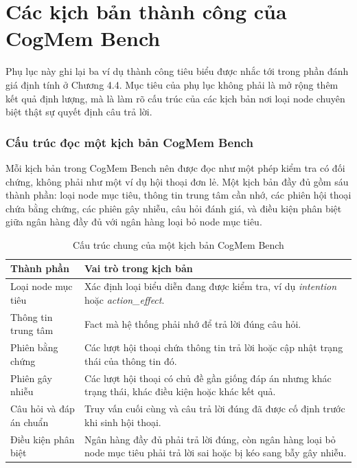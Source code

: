 \documentclass[../main.tex]{subfiles}
\begin{document}
\chapter{Các kịch bản thành công của CogMem Bench}
\label{app:cogmem_bench_success_cases}

Phụ lục này ghi lại ba ví dụ thành công tiêu biểu được nhắc tới trong phần đánh giá định tính ở Chương 4.4. Mục tiêu của phụ lục không phải là mở rộng thêm kết quả định lượng, mà là làm rõ cấu trúc của các kịch bản nơi loại node chuyên biệt thật sự quyết định câu trả lời.

\subsection{Cấu trúc đọc một kịch bản CogMem Bench}

Mỗi kịch bản trong CogMem Bench nên được đọc như một phép kiểm tra có đối chứng, không phải như một ví dụ hội thoại đơn lẻ. Một kịch bản đầy đủ gồm sáu thành phần: loại node mục tiêu, thông tin trung tâm cần nhớ, các phiên hội thoại chứa bằng chứng, các phiên gây nhiễu, câu hỏi đánh giá, và điều kiện phân biệt giữa ngân hàng đầy đủ với ngân hàng loại bỏ node mục tiêu.

\begin{table}[H]
\centering
\caption{Cấu trúc chung của một kịch bản CogMem Bench}
\label{tab:appendix_cogmem_bench_case_structure}
\small
\begin{tabularx}{\linewidth}{@{}p{3.1cm}Y@{}}
\toprule
\textbf{Thành phần} & \textbf{Vai trò trong kịch bản} \\
\midrule
Loại node mục tiêu & Xác định loại biểu diễn đang được kiểm tra, ví dụ \textit{intention} hoặc \textit{action\_effect}. \\
Thông tin trung tâm & Fact mà hệ thống phải nhớ để trả lời đúng câu hỏi. \\
Phiên bằng chứng & Các lượt hội thoại chứa thông tin trả lời hoặc cập nhật trạng thái của thông tin đó. \\
Phiên gây nhiễu & Các lượt hội thoại có chủ đề gần giống đáp án nhưng khác trạng thái, khác điều kiện hoặc khác kết quả. \\
Câu hỏi và đáp án chuẩn & Truy vấn cuối cùng và câu trả lời đúng đã được cố định trước khi sinh hội thoại. \\
Điều kiện phân biệt & Ngân hàng đầy đủ phải trả lời đúng, còn ngân hàng loại bỏ node mục tiêu phải trả lời sai hoặc bị kéo sang bẫy gây nhiễu. \\
\bottomrule
\end{tabularx}
\end{table}
\end{document}
